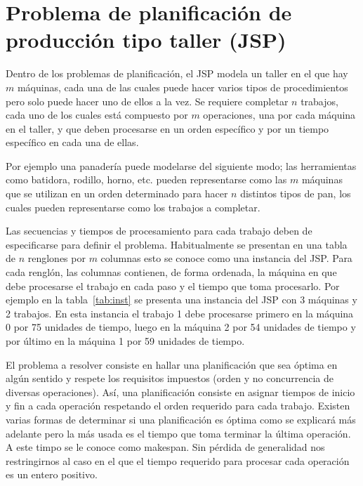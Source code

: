 \section{Problema de planificación de producción tipo taller (JSP)}

Dentro de los problemas de planificación, el JSP modela un taller en el que hay $m$ máquinas, cada una de las cuales puede hacer varios tipos 
de procedimientos pero solo puede hacer uno de ellos a la vez. 
%
Se requiere completar $n$ trabajos, cada uno de los cuales está compuesto por $m$ operaciones, una por cada máquina en el taller, y que deben 
procesarse en un orden específico y por un tiempo específico en cada una de ellas. 

Por ejemplo una panadería puede modelarse del siguiente modo; las herramientas como batidora, rodillo, horno, etc. pueden representarse como las
$m$ máquinas que se utilizan en un orden determinado para hacer $n$ distintos tipos de pan, los cuales pueden representarse como los trabajos 
a completar.

Las secuencias y tiempos de procesamiento para cada trabajo deben de especificarse para definir el problema. 
%
Habitualmente se presentan en una tabla de $n$ renglones por $m$ columnas esto se conoce como una instancia del JSP. 
%
Para cada renglón, las columnas contienen, de forma ordenada, la máquina en que debe procesarse el trabajo en cada paso y el tiempo 
que toma procesarlo. 
%
Por ejemplo en la tabla~\ref{tab:inst} se presenta una instancia del JSP con 3 máquinas y 2 trabajos. 
%
En esta instancia el trabajo 1 debe procesarse primero en la máquina 0 por 75 unidades de tiempo, luego en la máquina 2 por 54 unidades de tiempo y 
por último en la máquina 1 por 59 unidades de tiempo.

El problema a resolver consiste en hallar una planificación que sea óptima en algún sentido y respete los requisitos impuestos (orden y no concurrencia de diversas
operaciones).
%
Así, una planificación consiste en asignar tiempos de inicio y fin a cada operación respetando el orden requerido para cada trabajo. 
%
Existen varias formas de determinar si una planificación es óptima como se explicará más adelante pero la más usada es el tiempo que toma terminar la última operación.
%
A este timpo se le conoce como makespan. 
%
Sin pérdida de generalidad nos restringirnos al caso en el que el tiempo requerido para procesar cada operación es un entero positivo.

